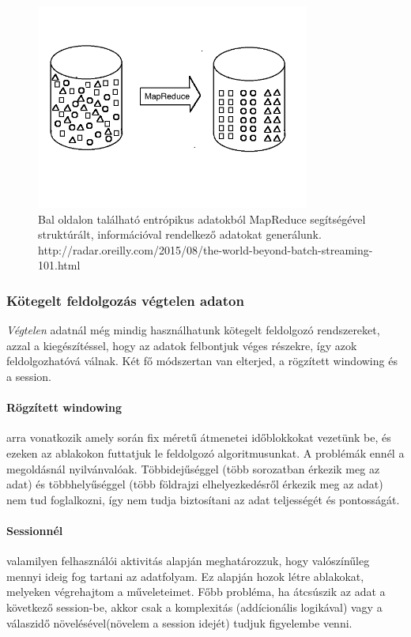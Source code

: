 \documentclass[a4paper,12pt]{article}
\begin{document}
\begin{figure}[ht!]
\centering
\includegraphics[width=90mm]{img/batch.png}
\caption{Bal oldalon található entrópikus adatokból MapReduce segítségével struktúrált, információval rendelkező adatokat generálunk.
http://radar.oreilly.com/2015/08/the-world-beyond-batch-streaming-101.html \label{batchreduce}}
\end{figure}

\subsubsection{Kötegelt feldolgozás végtelen adaton}
\textsl{Végtelen} adatnál még mindig használhatunk kötegelt feldolgozó rendszereket, azzal a kiegészítéssel, hogy az adatok felbontjuk véges részekre, így azok feldolgozhatóvá válnak. Két fő módszertan van elterjed, a rögzített windowing és a session.

\paragraph{Rögzített windowing} arra vonatkozik amely során fix méretű átmenetei időblokkokat vezetünk be, és ezeken az ablakokon futtatjuk le feldolgozó algoritmusunkat. A problémák ennél a megoldásnál nyilvánvalóak. Többidejűséggel (több sorozatban érkezik meg az adat) és többhelyűséggel (több földrajzi elhelyezkedésről érkezik meg az adat) nem tud foglalkozni, így nem tudja biztosítani az adat teljességét és pontosságát.

\paragraph{Sessionnél} valamilyen felhasználói aktivitás alapján meghatározzuk, hogy valószínűleg mennyi ideig fog tartani az adatfolyam. Ez alapján hozok létre ablakokat, melyeken végrehajtom a műveleteimet. Főbb probléma, ha átcsúszik az adat a következő session-be, akkor csak a komplexitás (addícionális logikával) vagy a válaszidő növelésével(növelem a session idejét) tudjuk figyelembe venni.
\end{document}
